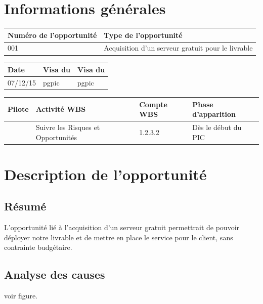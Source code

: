 \section*{Informations générales}
 
\begin{table}[H]
\centering
	\begin{tabularx}{16.8cm}{|X|X|}
	\hline
	\rowcolor{gray!40} Numéro de l'opportunité & Type de l'opportunité \\
	\hline
	001 & Acquisition d'un serveur gratuit pour le livrable \\
	\hline
	\end{tabularx}
\end{table}

\begin{table}[H]
\centering
	\begin{tabularx}{16.8cm}{|X|X|X|}
	\hline
	\rowcolor{gray!40} Date & Visa du \RQ & Visa du \CP \\
	\hline
	 07/12/15 & pgpic & pgpic \\
	\hline
	\end{tabularx}
\end{table}

\begin{table}[H]
\centering
	\begin{tabularx}{16.8cm}{|X|X|X|X|}
	\hline
	\rowcolor{gray!40} Pilote & Activité WBS & Compte WBS & Phase d'apparition \\
	\hline
	 \Matthieu & Suivre les Risques et Opportunités & 1.2.3.2 & Dès le début du PIC\\
	\hline
	\end{tabularx}
\end{table}

\section*{Description de l'opportunité}

\subsection*{Résumé}
	L'opportunité lié à l'acquisition d'un serveur gratuit permettrait de pouvoir déployer notre livrable et de mettre en place le service pour le client, sans contrainte budgétaire.
	
\subsection*{Analyse des causes}
	voir figure.

